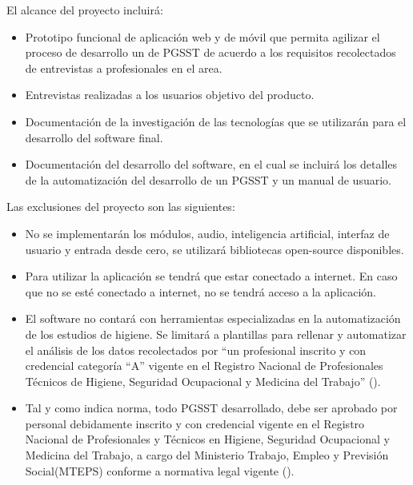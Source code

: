 \noindent
El alcance del proyecto incluirá:

\begin{itemize}
	\item Prototipo funcional de aplicación web y de móvil que permita agilizar el proceso de desarrollo un de PGSST de acuerdo a los requisitos recolectados de entrevistas a profesionales en el area.
	\item Entrevistas realizadas a los usuarios objetivo del producto.
	\item Documentación de la investigación de las tecnologías que se utilizarán para el
	desarrollo del software final.
	\item Documentación del desarrollo del software, en el cual se incluirá los detalles de la automatización del desarrollo de un PGSST y un manual de usuario.
\end{itemize}

\noindent
Las exclusiones del proyecto son las siguientes:
\begin{itemize}
	\item No se implementarán los módulos, audio, inteligencia artificial, interfaz de usuario y entrada desde cero, se utilizará bibliotecas open-source disponibles.
	\item Para utilizar la aplicación se tendrá que estar conectado a internet. En
	caso que no se esté conectado a internet, no se tendrá acceso a la
	aplicación.
	\item El software no contará con herramientas especializadas en la automatización de los estudios de higiene. Se limitará a plantillas para rellenar y automatizar el análisis de los datos recolectados por ``un profesional inscrito y con credencial categoría ``A'' vigente en el Registro Nacional de Profesionales Técnicos de Higiene, Seguridad Ocupacional y Medicina del Trabajo'' (\cite{NTS-009/23}).
	\item Tal y como indica norma, todo PGSST desarrollado, debe ser aprobado por personal debidamente inscrito y con credencial vigente en el Registro Nacional de Profesionales y Técnicos en Higiene, Seguridad Ocupacional y Medicina del Trabajo, a cargo del Ministerio Trabajo, Empleo y Previsión Social(MTEPS) conforme a normativa legal vigente (\cite{NTS-009/23}).
\end{itemize}
